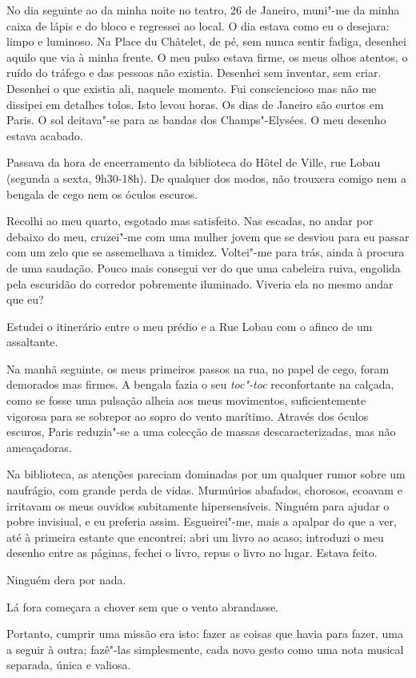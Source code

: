 No dia seguinte ao da minha noite no teatro, 26 de Janeiro, muni"-me da
minha caixa de lápis e do bloco e regressei ao local. O dia estava como
eu o desejara: limpo e luminoso. Na Place du Châtelet, de pé, sem nunca
sentir fadiga, desenhei aquilo que via à minha frente. O meu pulso
estava firme, os meus olhos atentos, o ruído do tráfego e das pessoas
não existia. Desenhei sem inventar, sem criar. Desenhei o que existia
ali, naquele momento. Fui consciencioso mas não me dissipei em detalhes
tolos. Isto levou horas. Os dias de Janeiro são curtos em Paris. O sol
deitava"-se para as bandas dos Champs"-Elysées. O meu desenho estava acabado.

Passava da hora de encerramento da biblioteca do Hôtel de Ville, rue
Lobau (segunda a sexta, 9h30-18h). De qualquer dos modos, não trouxera
comigo nem a bengala de cego nem os óculos escuros.

Recolhi ao meu quarto, esgotado mas satisfeito. Nas escadas, no andar
por debaixo do meu, cruzei"-me com uma mulher jovem que se desviou para
eu passar com um zelo que se assemelhava a timidez. Voltei"-me para trás,
ainda à procura de uma saudação. Pouco mais consegui ver do que uma
cabeleira ruiva, engolida pela escuridão do corredor pobremente iluminado. Viveria ela no mesmo andar que eu?

Estudei o itinerário entre o meu prédio e a Rue Lobau com o afinco de um
assaltante.

Na manhã seguinte, os meus primeiros passos na rua, no papel de cego,
foram demorados mas firmes. A bengala fazia
o seu \emph{toc"-toc }reconfortante na calçada, como se fosse uma pulsação alheia aos meus movimentos, suficientemente vigorosa para se
sobrepor ao sopro do vento marítimo. Através dos óculos escuros, Paris
reduzia"-se a uma colecção de massas descaracterizadas, mas não
ameaçadoras.

Na biblioteca, as atenções pareciam dominadas por um qualquer rumor
sobre um naufrágio, com grande perda de vidas. Murmúrios abafados,
chorosos, ecoavam e irritavam os meus ouvidos subitamente
hipersensíveis. Ninguém para ajudar o pobre invisiual, e eu preferia
assim. Esgueirei"-me, mais a apalpar do que a ver, até à primeira estante
que encontrei; abri um livro ao acaso; introduzi o meu desenho entre
as páginas, fechei o livro, repus o livro no lugar. Estava feito.

Ninguém dera por nada.

Lá fora começara a chover sem que o vento abrandasse.

Portanto, cumprir uma missão era isto: fazer as coisas que havia para
fazer, uma a seguir à outra; fazê"-las simplesmente, cada novo gesto como
uma nota musical separada, única e valiosa.

